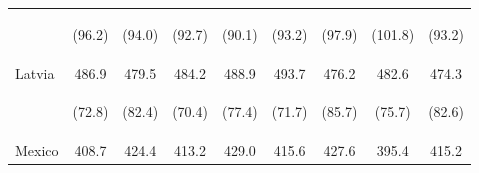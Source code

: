 \begin{center}
\begin{tabular}{lcccccccc}
 & \begin{footnotesize}(96.2)\end{footnotesize} & \begin{footnotesize}(94.0)\end{footnotesize} & \begin{footnotesize}(92.7)\end{footnotesize} & \begin{footnotesize}(90.1)\end{footnotesize} & \begin{footnotesize}(93.2)\end{footnotesize} & \begin{footnotesize}(97.9)\end{footnotesize} & \begin{footnotesize}(101.8)\end{footnotesize} & \begin{footnotesize}(93.2)\end{footnotesize}\\
\noalign{\smallskip}Latvia & 486.9 & 479.5 & 484.2 & 488.9 & 493.7 & 476.2 & 482.6 & 474.3\\
 & \begin{footnotesize}(72.8)\end{footnotesize} & \begin{footnotesize}(82.4)\end{footnotesize} & \begin{footnotesize}(70.4)\end{footnotesize} & \begin{footnotesize}(77.4)\end{footnotesize} & \begin{footnotesize}(71.7)\end{footnotesize} & \begin{footnotesize}(85.7)\end{footnotesize} & \begin{footnotesize}(75.7)\end{footnotesize} & \begin{footnotesize}(82.6)\end{footnotesize}\\
\noalign{\smallskip}Mexico & 408.7 & 424.4 & 413.2 & 429.0 & 415.6 & 427.6 & 395.4 & 415.2\\

\end{tabular}
\end{center}
